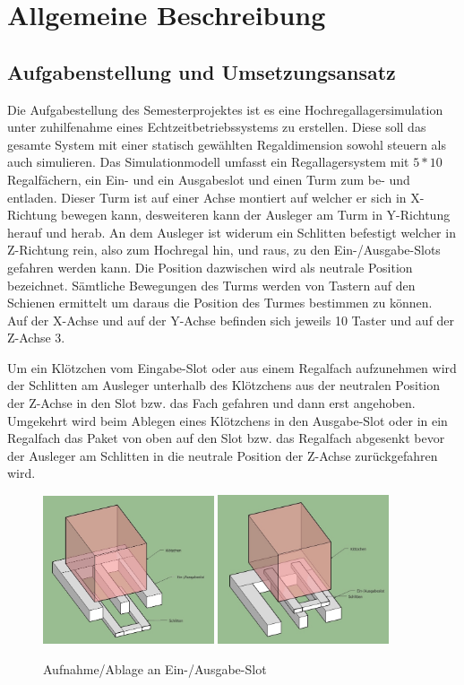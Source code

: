 \section{Allgemeine Beschreibung}
\subsection{Aufgabenstellung und Umsetzungsansatz}
Die Aufgabestellung des Semesterprojektes ist es eine Hochregallagersimulation unter zuhilfenahme eines Echtzeitbetriebssystems zu erstellen. Diese soll das gesamte System mit einer statisch gewählten Regaldimension sowohl steuern als auch simulieren.
Das Simulationmodell umfasst ein Regallagersystem mit $5*10$ Regalfächern, ein Ein- und ein Ausgabeslot und einen Turm zum be- und entladen. Dieser Turm ist auf einer Achse montiert auf welcher er sich in X-Richtung bewegen kann, desweiteren kann der Ausleger am Turm in Y-Richtung herauf und herab. An dem Ausleger ist widerum ein Schlitten befestigt welcher in Z-Richtung rein, also zum Hochregal hin, und raus, zu den Ein-/Ausgabe-Slots gefahren werden kann. Die Position dazwischen wird als neutrale Position bezeichnet. Sämtliche Bewegungen des Turms werden von Tastern auf den Schienen ermittelt um daraus die Position des Turmes bestimmen zu können.\\
Auf der X-Achse und auf der Y-Achse befinden sich jeweils 10 Taster und auf der Z-Achse 3.

Um ein Klötzchen vom Eingabe-Slot oder aus einem Regalfach aufzunehmen wird der Schlitten am Ausleger unterhalb des Klötzchens aus der neutralen Position der Z-Achse in den Slot bzw. das Fach gefahren und dann erst angehoben. Umgekehrt wird beim Ablegen eines Klötzchens in den Ausgabe-Slot oder in ein Regalfach das Paket von oben auf den Slot bzw. das Regalfach abgesenkt bevor der Ausleger am Schlitten  in die neutrale Position der Z-Achse zurückgefahren wird.
\begin{figure}[H]
	\centering
  \includegraphics[width=0.45\textwidth]{diagrams/vonunten.jpg}
  \includegraphics[width=0.45\textwidth]{diagrams/auflegernachoben.jpg}
	\caption{Aufnahme/Ablage an Ein-/Ausgabe-Slot}
	\label{fig2}
\end{figure}

